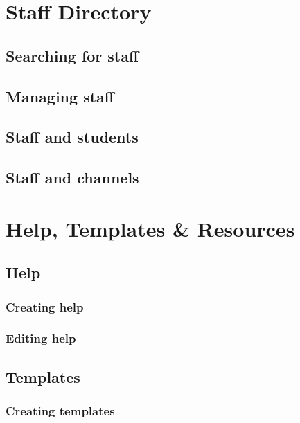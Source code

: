 \documentclass[12 pt]{book}
\begin{document}
%
%
%

\chapter{Staff Directory}

\section{Searching for staff}

\section{Managing staff}

\section{Staff and students}

\section{Staff and channels}

%
%
%

\chapter{Help, Templates \& Resources}

\section{Help}

\subsection{Creating help}

\subsection{Editing help}

\section{Templates}

\subsection{Creating templates}
\end{document}
